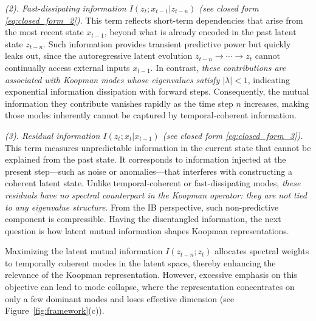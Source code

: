 \documentclass{article} %
\begin{document}
\textit{(2). Fast-dissipating information $I(z_{t}; x_{t-1}|z_{t-n})$ (see closed form \eqref{eq:closed_form_2}).} This term reflects short-term dependencies that arise from the most recent state $x_{t-1}$, beyond what is already encoded in the past latent state $z_{t-n}$. Such information provides transient predictive power but quickly leaks out, since the autoregressive latent evolution $z_{t-n} \to \cdots \to z_{t}$ cannot continually access external inputs $x_{t-1}$. In contrast, \textit{these contributions are associated with Koopman modes whose eigenvalues satisfy $|\lambda| < 1$}, indicating exponential information dissipation with forward steps. Consequently, the mutual information they contribute vanishes rapidly as the time step $n$ increases, making those modes inherently cannot be captured by temporal-coherent information. 

\textit{(3). Residual information $I(z_t; x_t|x_{t-1})$ (see closed form \eqref{eq:closed_form_3}).} This term measures unpredictable information in the current state that cannot be explained from the past state. It corresponds to information injected at the present step—such as noise or anomalies—that interferes with constructing a coherent latent state. Unlike temporal-coherent or fast-dissipating modes, \textit{these residuals have no spectral counterpart in the Koopman operator: they are not tied to any eigenvalue structure}. From the IB perspective, such non-predictive component is compressible. Having the disentangled information, the next question is how latent mutual information shapes Koopman representations.



\begin{claimwithframe} \label{KL_mutual_info}
Maximizing the latent mutual information \( I(z_{t-n}; z_{t}) \) allocates spectral weights to temporally coherent modes in the latent space, thereby enhancing the relevance of the Koopman representation. However, excessive emphasis on this objective can lead to mode collapse, where the representation concentrates on only a few dominant modes and loses effective dimension (see Figure~\ref{fig:framework}(c)).
 \end{claimwithframe}
 
 
\end{document}

